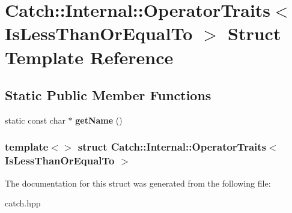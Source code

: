\hypertarget{structCatch_1_1Internal_1_1OperatorTraits_3_01IsLessThanOrEqualTo_01_4}{
\section{Catch::Internal::OperatorTraits$<$ IsLessThanOrEqualTo $>$ Struct Template Reference}
\label{structCatch_1_1Internal_1_1OperatorTraits_3_01IsLessThanOrEqualTo_01_4}
}
\subsection*{Static Public Member Functions}
\begin{DoxyCompactItemize}
\item 
\hypertarget{structCatch_1_1Internal_1_1OperatorTraits_3_01IsLessThanOrEqualTo_01_4_ae8578813bc847838f10448c1541a9d7b}{
static const char $\ast$ {\bfseries getName} ()}
\label{structCatch_1_1Internal_1_1OperatorTraits_3_01IsLessThanOrEqualTo_01_4_ae8578813bc847838f10448c1541a9d7b}

\end{DoxyCompactItemize}
\subsubsection*{template$<$$>$ struct Catch::Internal::OperatorTraits$<$ IsLessThanOrEqualTo $>$}



The documentation for this struct was generated from the following file:\begin{DoxyCompactItemize}
\item 
catch.hpp\end{DoxyCompactItemize}
